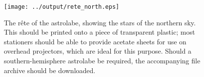 \documentclass[a4paper,onecolumn,10pt]{article}
\begin{document}
\begin{figure}
\centerline{\texttt{[image: ../output/rete\_north.eps]}}
\caption{The r\^ete of the astrolabe, showing the stars of the northern sky. This should be printed onto a piece of transparent plastic; most stationers should be able to provide acetate sheets for use on overhead projectors, which are ideal for this purpose. Should a southern-hemisphere astrolabe be required, the accompanying file archive should be downloaded.}
\label{rete}
\end{figure}
\end{document}
